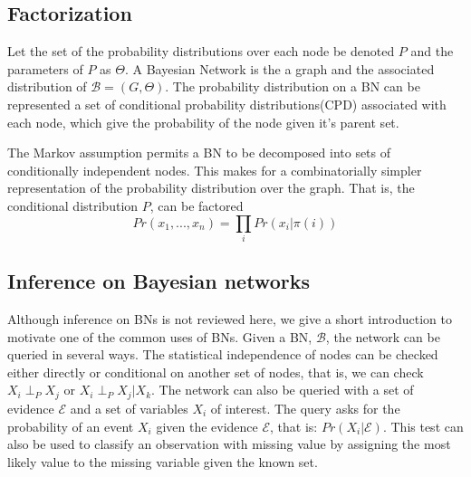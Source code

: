     \subsection{Factorization}

    Let the set of the probability distributions
    over each node be denoted $P$ and the parameters of 
    $P$ as $\Theta$. A Bayesian Network is the a
    graph and the associated
    distribution of $\mathcal{B} = (G, \Theta)$. The probability 
    distribution on a BN can be represented a set of
    conditional probability distributions(CPD) associated
    with each node, which give the probability of
    the node given it's parent set.

    The Markov assumption permits a BN to be decomposed into 
    sets of conditionally independent nodes. This makes for a 
    combinatorially simpler representation of the probability 
    distribution over the graph. That is, the conditional
    distribution $P$, can be factored 
    \[
       Pr(x_1,..., x_n) = \prod_i Pr(x_i | \pi(i))
    \]


    \subsection{Inference on Bayesian networks}

    Although inference on BNs is not reviewed here, we give a
    short introduction to motivate one of the common uses
    of BNs.
    Given a BN, $\mathcal{B}$, the network can be queried in
    several ways. The statistical independence of nodes can be
    checked either directly or conditional on another set 
    of nodes, that is, we can check $X_i \perp_P X_j$
    or $X_i \perp_P X_j | X_k$. 
    The network can also
    be queried with a set of evidence $\mathcal{E}$
    and a set of variables $X_i$ of interest. The query asks
    for the probability of an event $X_i$ given the evidence
    $\mathcal{E}$, that is: $Pr(X_i|\mathcal{E})$. This test
    can also be used to classify an observation with 
    missing value by assigning the most likely value to the 
    missing variable given the known set. 

